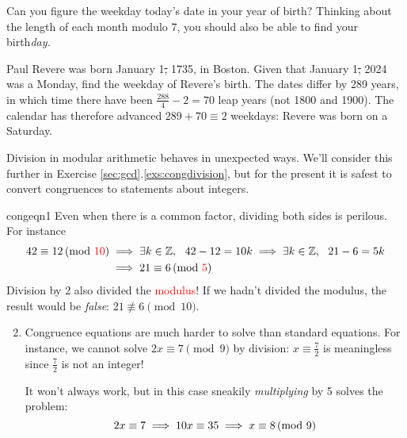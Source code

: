 Can you figure the weekday today's date in your year of birth? Thinking about the length of each month modulo 7, you should also be able to find your birth\emph{day.}

\begin{example}{}{}
	Paul Revere was born January 1\st, 1735, in Boston. Given that January 1\st, 2024 was a Monday, find the weekday of Revere's birth.\smallbreak
	The dates differ by 289 years, in which time there have been $\frac{288}4-2=70$ leap years (not 1800 and 1900). The calendar has therefore advanced $289+70\equiv 2$ weekdays: Revere was born on a Saturday.
\end{example}



Division in modular arithmetic behaves in unexpected ways. We'll consider this further in Exercise \ref*{sec:gcd}.\ref{exs:congdivision}, but for the present it is safest to convert congruences to statements about integers.

\begin{examples}{}{congeqn1}
	\exstart Even when there is a common factor, dividing both sides is perilous. For instance
	\begin{align*}
		42\equiv 12\negthickspace\pmod{\textcolor{red}{10}}&\implies \exists k\in\mathbb{Z},\ \ 42-12=10k \implies \exists k\in\mathbb{Z},\ \ 21-6=5k\\
		&\implies 21\equiv 6\negthickspace\pmod{\textcolor{red}{5}}
	\end{align*}
	Division by 2 also divided the \textcolor{red}{modulus}! If we hadn't divided the modulus, the result would be \emph{false}: $21\not\equiv 6\pmod{10}$.
			
	\begin{enumerate}\setcounter{enumi}{1}
		\item Congruence equations are much harder to solve than standard equations. For instance, we cannot solve $2x\equiv 7\pmod 9$ by division: $x\equiv \frac 72$ is meaningless since $\frac 72$ is not an integer!\par 		It won't always work, but in this case sneakily \emph{multiplying} by 5 solves the problem:
		\[
			2x\equiv 7\implies 10x\equiv 35\implies x\equiv 8\negthickspace\pmod{9}
		\]
	\end{enumerate}
\end{examples}


